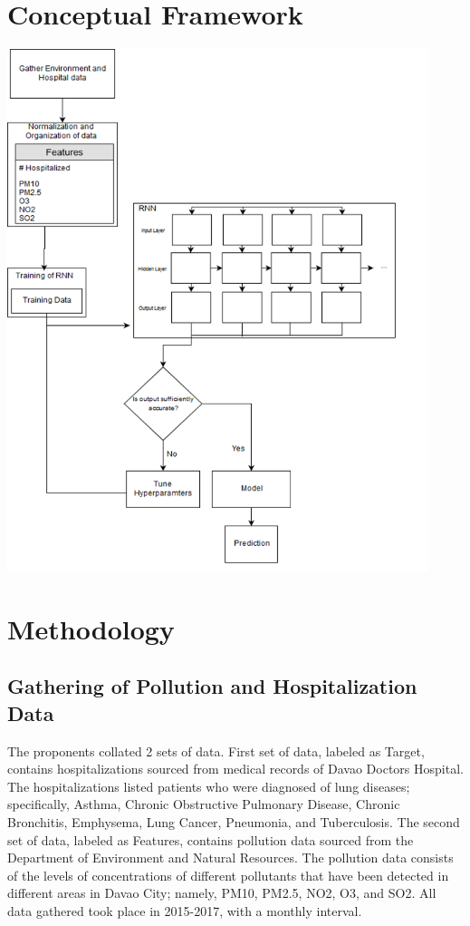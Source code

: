 \documentclass[10pt,11pt,12pt,oneside]{book}
\begin{document}
\section{Conceptual Framework}
\includegraphics[height=6in]{conframework.png}
\section{Methodology}
    \subsection{Gathering of Pollution and Hospitalization Data}
    The proponents collated 2 sets of data. First set of data, labeled as Target, contains hospitalizations sourced from medical records of Davao Doctors Hospital. The hospitalizations listed patients who were diagnosed of lung diseases; specifically, Asthma, Chronic Obstructive Pulmonary Disease, Chronic Bronchitis, Emphysema, Lung Cancer, Pneumonia, and Tuberculosis. The second set of data, labeled as Features, contains pollution data sourced from the Department of Environment and Natural Resources. The pollution data consists of the levels of concentrations of different pollutants that have been detected in different areas in Davao City; namely, PM10, PM2.5, NO2, O3, and SO2. All data gathered took place in 2015-2017, with a monthly interval.  
\end{document}
